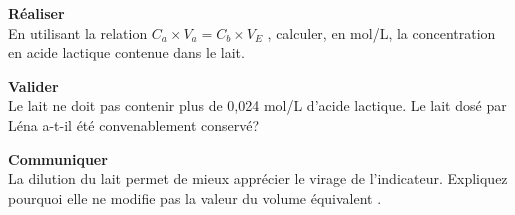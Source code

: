 \documentclass[11pt,a4paper]{article}
\newcommand{\cadreblanc}[1]{%
\medskip\framebox[\linewidth][c]{%
\rule{0mm}{#1mm}}\par
\medskip}
\begin{document}
\vspace{5mm}

\textbf{ Réaliser} \\

En utilisant la relation $C_a \times V_a = C_b \times V_E$ , calculer, en mol/L, la concentration en acide lactique contenue dans le lait. \\

\cadreblanc{15}











\textbf{ Valider} \\

 Le lait ne doit pas contenir plus de 0,024 mol/L d'acide lactique. Le lait dosé par Léna a-t-il été convenablement conservé?

\cadreblanc{15}



\textbf{ Communiquer} \\[3mm]

La dilution du lait permet de mieux apprécier le virage de l’indicateur. Expliquez pourquoi elle ne modifie pas la valeur du volume équivalent .

\cadreblanc{15}



  \vfill 
  
\end{document}

